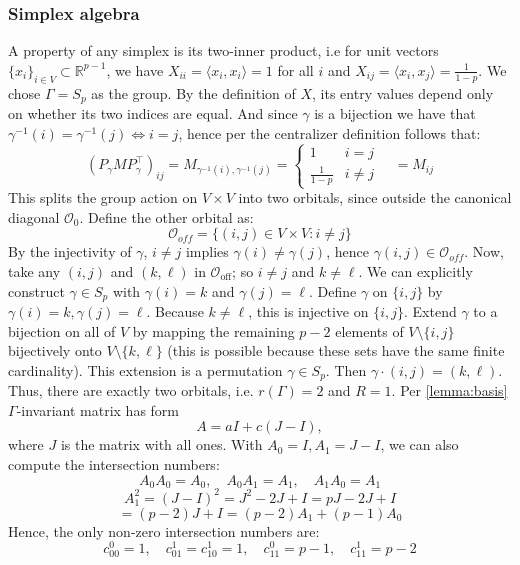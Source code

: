 \documentclass{article}
\theoremstyle{plain}
\numberwithin{equation}{section}
\theoremstyle{definition}
\theoremstyle{remark}
\begin{document}
\subsubsection{Simplex algebra} \label{appendix:simplex}
A property of any simplex is its two-inner product, i.e for unit vectors $\{x_i\}_{i\in V}\subset \mathbb{R}^{p-1}$, we have $X_{ii}=\langle x_i, x_i\rangle = 1$ for all $i$ and $X_{ij}=\langle x_i, x_j\rangle = \frac{1}{1-p}$. We chose $\Gamma = S_p$ as the group. By the definition of $X$, its entry values depend only on whether its two indices are equal. And since $\gamma$ is a bijection we have that $\gamma^{-1}(i) = \gamma^{-1}(j)\Leftrightarrow i =j$, hence per the centralizer definition follows that: $$(P_\gamma MP_\gamma^\top)_{ij} = M_{\gamma^{-1}(i), \gamma^{-1}(j)} = \left\{\begin{matrix}
1 & i=j \\\frac{1}{1-p} & i\neq j
\end{matrix}\right. \quad = M_{ij}$$
This splits the group action on $V\times V$ into two orbitals, since outside the canonical diagonal $\mathcal{O}_0$. Define the other orbital as: $$\mathcal{O}_{off} = \{(i, j)\in V\times V: i\neq j\}$$
By the injectivity of $\gamma$, $i\neq j$ implies $\gamma(i)\neq \gamma(j)$, hence $\gamma(i, j)\in \mathcal{O}_{off}$. Now, take any $(i, j)$ and $(k, \ell)$ in $\mathcal{O}_{\text{off}}$; so $i \neq j$ and $k \neq \ell$. We can explicitly construct $\gamma \in S_p$ with $\gamma(i) = k$ and $\gamma(j) = \ell$. Define $\gamma$ on $\{i, j\}$ by $\gamma(i) = k, \gamma(j) = \ell$. Because $k \neq \ell$, this is injective on $\{i, j\}$. Extend $\gamma$ to a bijection on all of $V$ by mapping the remaining $p - 2$ elements of $V \setminus \{i, j\}$ bijectively onto $V \setminus \{k, \ell\}$ (this is possible because these sets have the same finite cardinality). This extension is a permutation $\gamma \in S_p$. Then $\gamma \cdot (i, j) = (k, \ell)$. Thus, there are exactly two orbitals, i.e. $r(\Gamma) = 2$ and $R=1$. Per \ref{lemma:basis} $\Gamma$-invariant matrix has form $$A = a I + c(J-I),$$
where $J$ is the matrix with all ones. 
With $A_0 = I, A_1 = J-I$, we can also compute the intersection numbers:
$$A_0A_0 = A_0,\quad  A_0A_1 = A_1, \quad A_1 A_0 = A_1$$
$$A_1^2 = (J-I)^2 = J^2-2J+I= pJ-2J+I $$
$$= (p-2)J+I=(p-2)A_1+(p-1)A_0$$
Hence, the only non-zero intersection numbers are: $$c_{00}^0 = 1, \quad c_{01}^1 = c_{10}^1 = 1, \quad c_{11}^0 = p-1, \quad c_{11}^1 = p-2$$
\end{document}
